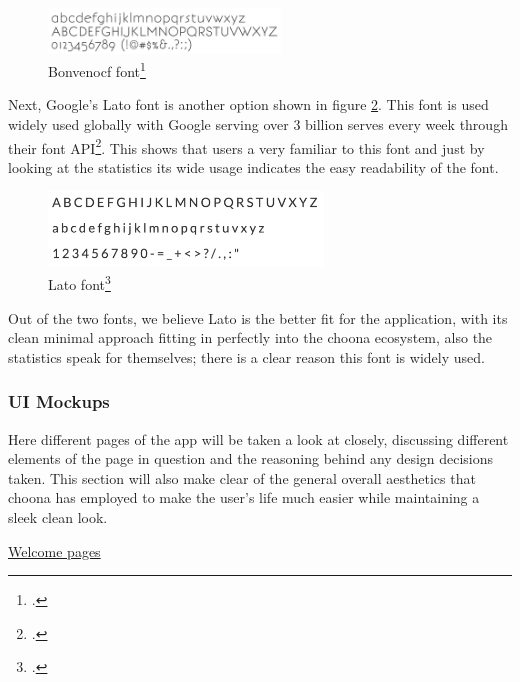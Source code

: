 \begin{figure}[h!]
\centering
\includegraphics[width=0.55\textwidth]{./img/bonvenocf.png}
\caption{Bonvenocf font\footcite{bonvenocf}}
\label{fig:Bonvenocf}
\end{figure}

Next, Google's Lato font is another option shown in figure \ref{fig:lato}. This font is used widely used globally with Google serving over 3 billion serves every week through their font API\footcite{googlelato}. This shows that users a very familiar to this font and just by looking at the statistics its wide usage indicates the easy readability of the font.

\begin{figure}[h!]
\centering
\includegraphics[width=0.65\textwidth]{./img/lato.png}
\caption{Lato font\footcite{googlelato}}
\label{fig:lato}
\end{figure}

Out of the two fonts, we believe Lato is the better fit for the application, with its clean minimal approach fitting in perfectly into the choona ecosystem, also the statistics speak for themselves; there is a clear reason this font is widely used.\\

\subsubsection*{UI Mockups}

Here different pages of the app will be taken a look at closely, discussing different elements of the page in question and the reasoning behind any design decisions taken. This section will also make clear of the general overall aesthetics that choona has employed to make the user's life much easier while maintaining a sleek clean look.\\

\newpage

\noindent\underline{Welcome pages}\newline

